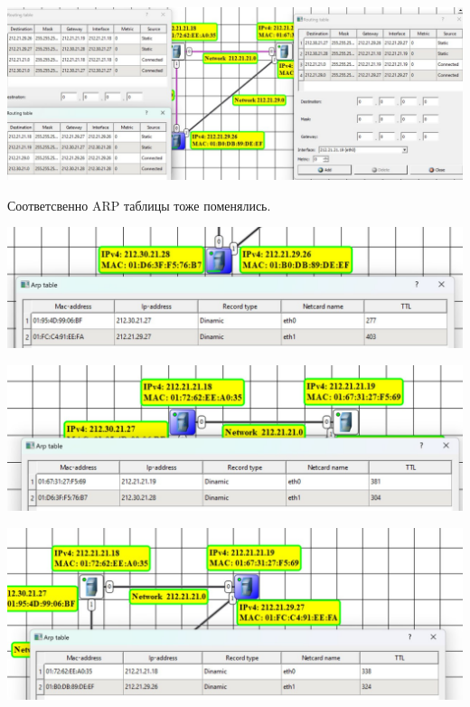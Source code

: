 \documentclass{article}
\begin{document}
\begin{center}
    \includegraphics[width=.9\textwidth]{13}
\end{center}
Соответсвенно ARP таблицы тоже поменялись.

\begin{minipage}{.5\textwidth}
    \begin{center}
        \includegraphics[width=.9\textwidth]{14}
    \end{center}
\end{minipage}
\hfill
\begin{minipage}{.5\textwidth}
    \begin{center}
        \includegraphics[width=.9\textwidth]{15}
    \end{center}
\end{minipage}

\begin{center}
    \includegraphics[width=.9\textwidth]{16}
\end{center}
\end{document}
